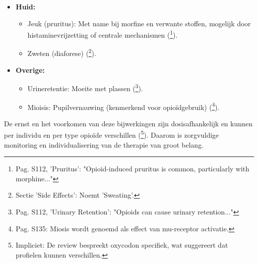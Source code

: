 \documentclass[11pt, a4paper]{report} %
\begin{document}
\begin{itemize}
\begin{itemize}
            \item Droge mond (xerostomie) (\cite{ClevelandClinicOpioids}\footnote{Sectie 'Side Effects': Noemt 'Dry mouth'.}).
        \end{itemize}
    \item \textbf{Huid:}
        \begin{itemize}
            \item Jeuk (pruritus): Met name bij morfine en verwante stoffen, mogelijk door histaminevrijzetting of centrale mechanismen (\cite{Benyamin2008OpioidComplications}\footnote{Pag. S112, 'Pruritus': "Opioid-induced pruritus is common, particularly with morphine..."}).
            \item Zweten (diaforese) (\cite{ClevelandClinicOpioids}\footnote{Sectie 'Side Effects': Noemt 'Sweating'.}).
        \end{itemize}
    \item \textbf{Overige:}
        \begin{itemize}
            \item Urineretentie: Moeite met plassen (\cite{Benyamin2008OpioidComplications}\footnote{Pag. S112, 'Urinary Retention': "Opioids can cause urinary retention..."}).
            \item Mioisis: Pupilvernauwing (kenmerkend voor opioïdgebruik) (\cite{Trescot2008OpioidPharm}\footnote{Pag. S135: Miosis wordt genoemd als effect van mu-receptor activatie.}).
        \end{itemize}
\end{itemize}
De ernst en het voorkomen van deze bijwerkingen zijn dosisafhankelijk en kunnen per individu en per type opioïde verschillen (\cite{Riley2008OxycodoneReview}\footnote{Impliciet: De review bespreekt oxycodon specifiek, wat suggereert dat profielen kunnen verschillen.}). Daarom is zorgvuldige monitoring en individualisering van de therapie van groot belang.
\end{document}
